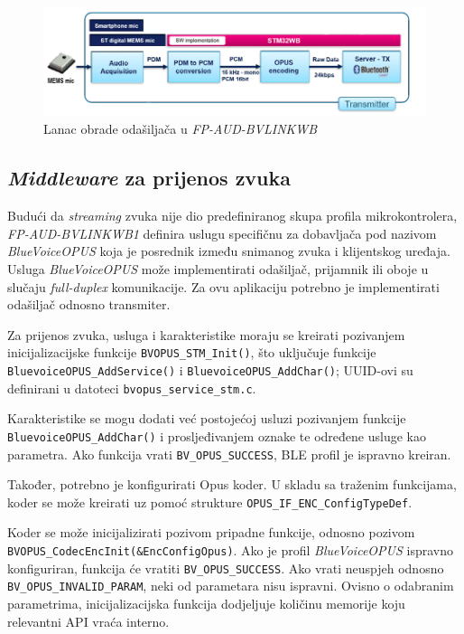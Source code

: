\begin{figure}[ht]
	\includegraphics[width=\linewidth]{imgs/duplex_chain}
	\caption{Lanac obrade odašiljača u \textit{FP-AUD-BVLINKWB} \cite{fpaudbvlink}}
	\label{fig:duplex_chain}
\end{figure}

\subsection{\textit{Middleware} za prijenos zvuka}

Budući da \textit{streaming} zvuka nije dio predefiniranog skupa profila mikrokontrolera, \textit{FP-AUD-BVLINKWB1} definira uslugu specifičnu za dobavljača pod nazivom \textit{BlueVoiceOPUS} koja je posrednik između snimanog zvuka i  klijentskog uređaja. 
Usluga \textit{BlueVoiceOPUS} može implementirati odašiljač, prijamnik ili oboje u slučaju \textit{full-duplex} komunikacije. Za ovu aplikaciju potrebno je implementirati odašiljač odnosno transmiter.

Za prijenos zvuka, usluga i karakteristike moraju se kreirati pozivanjem inicijalizacijske funkcije \lstinline|BVOPUS_STM_Init()|, što uključuje funkcije \newline \lstinline|BluevoiceOPUS_AddService()| i \lstinline|BluevoiceOPUS_AddChar()|; UUID-ovi su definirani u datoteci \lstinline|bvopus_service_stm.c|.

Karakteristike se mogu dodati već postojećoj usluzi pozivanjem funkcije \newline \lstinline|BluevoiceOPUS_AddChar()| i prosljeđivanjem oznake te određene usluge kao parametra. Ako funkcija vrati \lstinline|BV_OPUS_SUCCESS|, BLE profil je ispravno kreiran.

Također, potrebno je konfigurirati Opus koder. U skladu sa traženim funkcijama, koder se može kreirati uz pomoć strukture \newline \lstinline|OPUS_IF_ENC_ConfigTypeDef|.

Koder se može inicijalizirati pozivom pripadne funkcije, odnosno pozivom \newline \lstinline|BVOPUS_CodecEncInit(&EncConfigOpus)|. Ako je profil \textit{BlueVoiceOPUS} ispravno konfiguriran, funkcija će vratiti \lstinline|BV_OPUS_SUCCESS|. Ako vrati neuspjeh odnosno \lstinline|BV_OPUS_INVALID_PARAM|, neki od parametara nisu ispravni. Ovisno o odabranim parametrima, inicijalizacijska funkcija dodjeljuje količinu memorije koju relevantni API vraća interno. 

